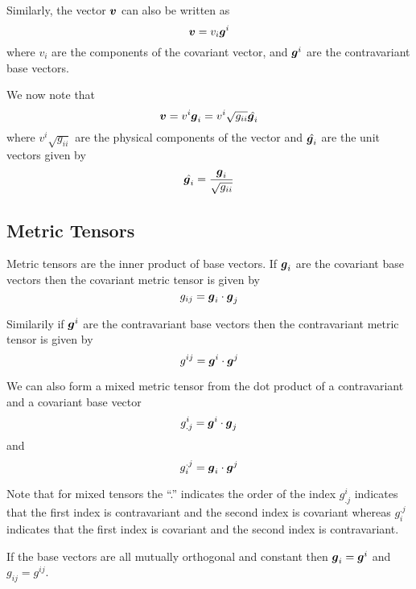 Similarly, the vector $\vect{v}$ can also be written as 
\begin{equation}
  \vect{v}=v_{i}\vect{g}^{i}
\end{equation}
where $v_{i}$ are the components of the covariant vector, and
$\vect{g}^{i}$ are the contravariant base vectors. 

We now note that
\begin{equation}
  \vect{v}=v^{i}\vect{g}_{i}=v^{i}\sqrt{g_{ii}}\hat{\vect{g}_{i}}
\end{equation}
where $v^{i}\sqrt{g_{ii}}$ are the physical components of the vector and
$\hat{\vect{g}_{i}}$ are the unit vectors given by
\begin{equation}
  \hat{\vect{g}_{i}}=\dfrac{\vect{g}_{i}}{\sqrt{g_{ii}}}
\end{equation}

\subsection{Metric Tensors}
\label{sec:metric tensors}

Metric tensors are the inner product of base vectors. If $\vect{g}_{i}$ are the
covariant base vectors then the covariant metric tensor is given by
\begin{equation}
  g_{ij}=\dotprod{\vect{g}_{i}}{\vect{g}_{j}}
\end{equation}

Similarily if $\vect{g}^{i}$ are the contravariant base vectors then the
contravariant metric tensor is given by 
\begin{equation}
  g^{ij}=\dotprod{\vect{g}^{i}}{\vect{g}^{j}}
\end{equation}

We can also form a mixed metric tensor from the dot product of a contravariant
and a covariant base vector \ie
\begin{equation}
  g^{i}_{.j}=\dotprod{\vect{g}^{i}}{\vect{g}_{j}}
\end{equation}
and 
\begin{equation}
  g_{i}^{.j}=\dotprod{\vect{g}_{i}}{\vect{g}^{j}}
\end{equation}

Note that for mixed tensors the ``.'' indicates the order of the index \ie
$g^{i}_{.j}$ indicates that the first index is contravariant and the second
index is covariant whereas $g_{i}^{.j}$ indicates that the first index is
covariant and the second index is contravariant.

If the base vectors are all mutually orthogonal and constant then
$\vect{g}_{i}=\vect{g}^{i}$ and $g_{ij}=g^{ij}$.


